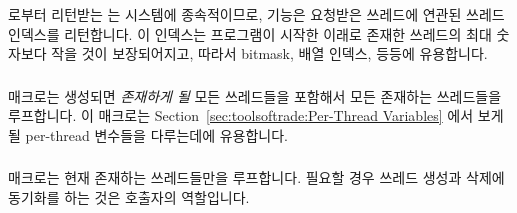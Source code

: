 \subsubsection{}

 로부터 리턴받는  는 시스템에 종속적이므로,
 기능은 요청받은 쓰레드에 연관된 쓰레드 인덱스를
리턴합니다.
이 인덱스는 프로그램이 시작한 이래로 존재한 쓰레드의 최대 숫자보다 작을 것이
보장되어지고, 따라서 bitmask, 배열 인덱스, 등등에 유용합니다.

\subsubsection{}

 매크로는 생성되면 \emph{존재하게 될} 모든 쓰레드들을
포함해서 모든 존재하는 쓰레드들을 루프합니다.
이 매크로는 Section~\ref{sec:toolsoftrade:Per-Thread Variables} 에서 보게 될
per-thread 변수들을 다루는데에 유용합니다.

\subsubsection{}

 매크로는 현재 존재하는 쓰레드들만을 루프합니다.
필요할 경우 쓰레드 생성과 삭제에 동기화를 하는 것은 호출자의 역할입니다.

\subsubsection{}

